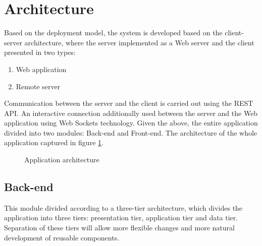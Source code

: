 \documentclass[thesis=B,english]{FITthesis}[2019/03/06]
\begin{document}
\section{Architecture}
Based on the deployment model, the system is developed based on the client-server architecture, where the server implemented as a Web server and the client presented in two types: 
\begin{enumerate}
 \item Web application
 \item Remote server
\end{enumerate} 
Communication between the server and the client is carried out using the REST API.  An interactive connection additionally used between the server and the Web application using Web Sockets technology.
Given the above, the entire application divided into two modules: Back-end and Front-end. The architecture of the whole application captured in figure \ref{fig:BP_ARCHITECTURE}.
 \begin{figure}[!ht]
\centering 
{}
\caption{Application architecture}
\label{fig:BP_ARCHITECTURE} 
\end{figure} 
\subsection{Back-end} 
This module divided according to a three-tier architecture, which divides the application into three tiers: presentation tier, application tier and data tier.  Separation of these tiers will allow more flexible changes and more natural development of reusable components.
\end{document}

